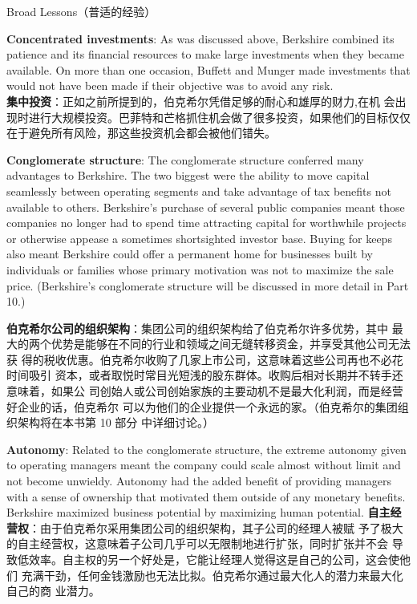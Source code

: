 \begin{section}{Broad Lessons（普适的经验）}
\begin{verseparallel}
  {
    \textbf{Concentrated investments}: As was discussed above, Berkshire
    combined its patience and its financial resources to make large investments
    when they became available. On more than one occasion, Buffett and Munger
    made investments that would not have been made if their objective was to
    avoid any risk. \\
  }
  {
    \textbf{集中投资}：正如之前所提到的，伯克希尔凭借足够的耐心和雄厚的财力,在机
    会出现时进行大规模投资。巴菲特和芒格抓住机会做了很多投资，如果他们的目标仅仅
    在于避免所有风险，那这些投资机会都会被他们错失。
  }
\end{verseparallel}

\begin{verseparallel}
  {

    \textbf{Conglomerate structure}: The conglomerate structure conferred many
    advantages to Berkshire. The two biggest were the ability to move capital
    seamlessly between operating segments and take advantage of tax benefits not
    available to others. Berkshire's purchase of several public companies meant
    those companies no longer had to spend time attracting capital for
    worthwhile projects or otherwise appease a sometimes shortsighted investor
    base. Buying for keeps also meant Berkshire could offer a permanent home for
    businesses built by individuals or families whose primary motivation was not
    to maximize the sale price. (Berkshire's conglomerate structure will be
    discussed in more detail in Part 10.) \\
  }
  {
    \textbf{伯克希尔公司的组织架构}：集团公司的组织架构给了伯克希尔许多优势，其中
    最大的两个优势是能够在不同的行业和领域之间无缝转移资金，并享受其他公司无法获
    得的税收优惠。伯克希尔收购了几家上市公司，这意味着这些公司再也不必花时间吸引
    资本，或者取悦时常目光短浅的股东群体。收购后相对长期并不转手还意味着，如果公
    司创始人或公司创始家族的主要动机不是最大化利润，而是经营好企业的话，伯克希尔
    可以为他们的企业提供一个永远的家。（伯克希尔的集团组织架构将在本书第 10 部分
    中详细讨论。）
  }
\end{verseparallel}

\begin{verseparallel}
  {
    \textbf{Autonomy}: Related to the conglomerate structure, the extreme
    autonomy given to operating managers meant the company could scale almost
    without limit and not become unwieldy. Autonomy had the added benefit of
    providing managers with a sense of ownership that motivated them outside of
    any monetary benefits. Berkshire maximized business potential by maximizing
    human potential.
  }
  {
    \textbf{自主经营权}：由于伯克希尔采用集团公司的组织架构，其子公司的经理人被赋
    予了极大的自主经营权，这意味着子公司几乎可以无限制地进行扩张，同时扩张并不会
    导致低效率。自主权的另一个好处是，它能让经理人觉得这是自己的公司，这会使他们
    充满干劲，任何金钱激励也无法比拟。伯克希尔通过最大化人的潜力来最大化自己的商
    业潜力。
  }
\end{verseparallel}


\end{section}
